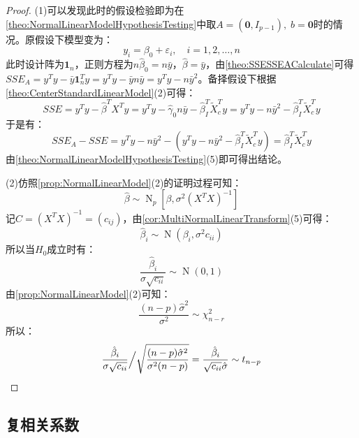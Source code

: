 \begin{proof}
	(1)可以发现此时的假设检验即为在\cref{theo:NormalLinearModelHypothesisTesting}中取$A=(\mathbf{0},I_{p-1}),\;b=\mathbf{0}$时的情况。原假设下模型变为：
	\begin{equation*}
		y_i=\beta_0+\varepsilon_i,\quad i=1,2,\dots,n
	\end{equation*}
	此时设计阵为$\mathbf{1}_n$，正则方程为$n\hat{\beta}_0=n\bar{y}$，$\hat{\beta}=\bar{y}$，由\cref{theo:SSESSEACalculate}可得$SSE_A=y^Ty-\bar{y}\mathbf{1}_n^Ty=y^Ty-\bar{y}n\bar{y}=y^Ty-n\bar{y}^2$。备择假设下根据\cref{theo:CenterStandardLinearModel}(2)可得：
	\begin{equation*}
		SSE=y^Ty-\hat{\beta}^TX^Ty=y^Ty-\hat{\gamma}_0n\bar{y}-\hat{\beta}_I^T\tilde{X}_c^Ty=y^Ty-n\bar{y}^2-\hat{\beta}_I^T\tilde{X}_c^Ty
	\end{equation*}
	于是有：
	\begin{equation*}
		SSE_A-SSE=y^Ty-n\bar{y}^2-(y^Ty-n\bar{y}^2-\hat{\beta}_I^T\tilde{X}_c^Ty)=\hat{\beta}_I^T\tilde{X}_c^Ty
	\end{equation*}
	由\cref{theo:NormalLinearModelHypothesisTesting}(5)即可得出结论。\par
	(2)仿照\cref{prop:NormalLinearModel}(2)的证明过程可知：
	\begin{equation*}
		\hat{\beta}\sim\operatorname{N}_p[\beta,\sigma^2(X^TX)^{-1}]
	\end{equation*}
	记$C=(X^TX)^{-1}=(c_{ij})$，由\cref{cor:MultiNormalLinearTransform}(5)可得：
	\begin{equation*}
		\hat{\beta}_i\sim\operatorname{N}(\beta_i,\sigma^2c_{ii})
	\end{equation*}
	所以当$H_0$成立时有：
	\begin{equation*}
		\frac{\hat{\beta}_i}{\sigma\sqrt{c_{ii}}}\sim\operatorname{N}(0,1)
	\end{equation*}
	由\cref{prop:NormalLinearModel}(2)可知：
	\begin{equation*}
		\frac{(n-p)\hat{\sigma}^2}{\sigma^2}\sim\chi_{n-r}^2
	\end{equation*}
	所以：
	\begin{equation*}
		\frac{\hat{\beta}_i}{\sigma\sqrt{c_{ii}}}\Big/\sqrt{\frac{(n-p)\hat{\sigma}^2}{\sigma^2(n-p)}}=\frac{\hat{\beta}_i}{\sqrt{c_{ii}}\hat{\sigma}}\sim t_{n-p}\qedhere
	\end{equation*}
\end{proof}

\subsection{复相关系数}

